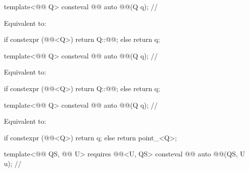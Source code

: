 \begin{itemdecl}
template<@@ Q>
consteval @@ auto @@(Q q);                  // \expos
\end{itemdecl}

\begin{itemdescr}
\pnum
\effects
Equivalent to:
\begin{codeblock}
if constexpr (@@<Q>)
  return Q::@@;
else
  return q;
\end{codeblock}
\end{itemdescr}

\begin{itemdecl}
template<@@ Q>
consteval @@ auto @@(Q q);                  // \expos
\end{itemdecl}

\begin{itemdescr}
\pnum
\effects
Equivalent to:
\begin{codeblock}
if constexpr (@@<Q>)
  return Q::@@;
else
  return q;
\end{codeblock}
\end{itemdescr}

\begin{itemdecl}
template<@@ Q>
consteval @@ auto @@(Q q);                      // \expos
\end{itemdecl}

\begin{itemdescr}
\pnum
\effects
Equivalent to:
\begin{codeblock}
if constexpr (@@<Q>)
  return q;
else
  return point_<Q>{};
\end{codeblock}
\end{itemdescr}

\begin{itemdecl}
template<@@ QS, @@ U>
  requires @@<U, QS{}>
consteval @@ auto @@(QS, U u);  // \expos
\end{itemdecl}

